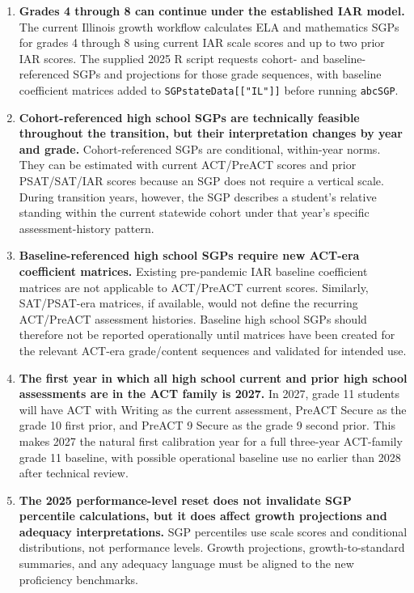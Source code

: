 \documentclass[11pt]{article}
\begin{document}
\begin{enumerate}
\item \textbf{Grades 4 through 8 can continue under the established IAR model.} The current Illinois growth workflow calculates ELA and mathematics SGPs for grades 4 through 8 using current IAR scale scores and up to two prior IAR scores. The supplied 2025 R script requests cohort- and baseline-referenced SGPs and projections for those grade sequences, with baseline coefficient matrices added to \texttt{SGPstateData[["IL"]]} before running \texttt{abcSGP}.

\item \textbf{Cohort-referenced high school SGPs are technically feasible throughout the transition, but their interpretation changes by year and grade.} Cohort-referenced SGPs are conditional, within-year norms. They can be estimated with current ACT/PreACT scores and prior PSAT/SAT/IAR scores because an SGP does not require a vertical scale. During transition years, however, the SGP describes a student's relative standing within the current statewide cohort under that year's specific assessment-history pattern.

\item \textbf{Baseline-referenced high school SGPs require new ACT-era coefficient matrices.} Existing pre-pandemic IAR baseline coefficient matrices are not applicable to ACT/PreACT current scores. Similarly, SAT/PSAT-era matrices, if available, would not define the recurring ACT/PreACT assessment histories. Baseline high school SGPs should therefore not be reported operationally until matrices have been created for the relevant ACT-era grade/content sequences and validated for intended use.

\item \textbf{The first year in which all high school current and prior high school assessments are in the ACT family is 2027.} In 2027, grade 11 students will have ACT with Writing as the current assessment, PreACT Secure as the grade 10 first prior, and PreACT 9 Secure as the grade 9 second prior. This makes 2027 the natural first calibration year for a full three-year ACT-family grade 11 baseline, with possible operational baseline use no earlier than 2028 after technical review.

\item \textbf{The 2025 performance-level reset does not invalidate SGP percentile calculations, but it does affect growth projections and adequacy interpretations.} SGP percentiles use scale scores and conditional distributions, not performance levels. Growth projections, growth-to-standard summaries, and any adequacy language must be aligned to the new proficiency benchmarks.
\end{enumerate}
\end{document}
